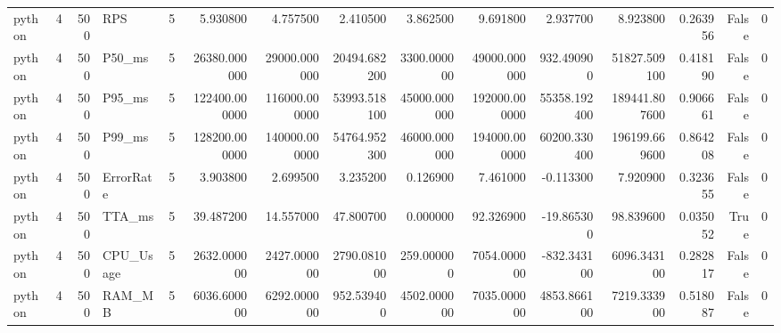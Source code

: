 \begin{tabular}{lrrlrrrrrrrrrrr}
python & 4 & 500 & RPS & 5 & 5.930800 & 4.757500 & 2.410500 & 3.862500 & 9.691800 & 2.937700 & 8.923800 & 0.263956 & False & 0 \\
python & 4 & 500 & P50_ms & 5 & 26380.000000 & 29000.000000 & 20494.682200 & 3300.000000 & 49000.000000 & 932.490900 & 51827.509100 & 0.418190 & False & 0 \\
python & 4 & 500 & P95_ms & 5 & 122400.000000 & 116000.000000 & 53993.518100 & 45000.000000 & 192000.000000 & 55358.192400 & 189441.807600 & 0.906661 & False & 0 \\
python & 4 & 500 & P99_ms & 5 & 128200.000000 & 140000.000000 & 54764.952300 & 46000.000000 & 194000.000000 & 60200.330400 & 196199.669600 & 0.864208 & False & 0 \\
python & 4 & 500 & ErrorRate & 5 & 3.903800 & 2.699500 & 3.235200 & 0.126900 & 7.461000 & -0.113300 & 7.920900 & 0.323655 & False & 0 \\
python & 4 & 500 & TTA_ms & 5 & 39.487200 & 14.557000 & 47.800700 & 0.000000 & 92.326900 & -19.865300 & 98.839600 & 0.035052 & True & 0 \\
python & 4 & 500 & CPU_Usage & 5 & 2632.000000 & 2427.000000 & 2790.081000 & 259.000000 & 7054.000000 & -832.343100 & 6096.343100 & 0.282817 & False & 0 \\
python & 4 & 500 & RAM_MB & 5 & 6036.600000 & 6292.000000 & 952.539400 & 4502.000000 & 7035.000000 & 4853.866100 & 7219.333900 & 0.518087 & False & 0 \\
\bottomrule
\end{tabular}
